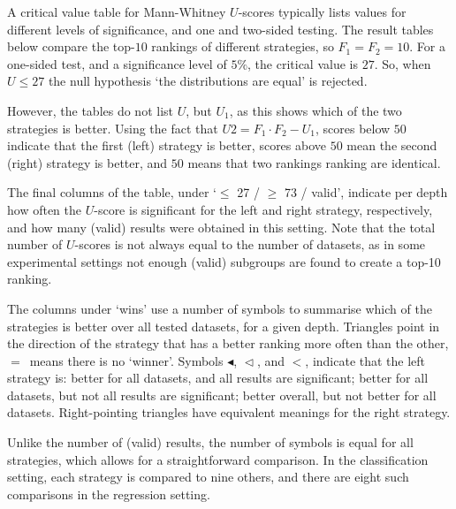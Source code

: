 \documentclass[smallextended]{svjour3}
\newcommand{\lmix}{$<$}                   %
\newcommand{\lall}{$\vartriangleleft$}    %
\newcommand{\lasi}{$\blacktriangleleft$}  %
\newcommand{\draw}{$=$}                   %
\begin{document}
A critical value table for Mann-Whitney $U$-scores typically lists values for different levels of significance, and one and two-sided testing.
The result tables below compare the top-$10$ rankings of different strategies, so $F_1 = F_2 = 10$.
For a one-sided test, and a significance level of $5\%$, the critical value is $27$.
So, when $U \leq 27$ the null hypothesis `the distributions are equal' is rejected.

However, the tables do not list $U$, but $U_1$, as this shows which of the two strategies is better.
Using the fact that $U2 = F_1 \cdot F_2 - U_1$, scores below $50$ indicate that the first (left) strategy is better, scores above $50$ mean the second (right) strategy is better, and $50$ means that two rankings ranking are identical.

The final columns of the table, under `$\leq$ 27 / $\geq$ 73 / valid', indicate per depth how often the $U$-score is significant for the left and right strategy, respectively, and how many (valid) results were obtained in this setting.
Note that the total number of $U$-scores is not always equal to the number of datasets, as in some experimental settings not enough (valid) subgroups are found to create a top-10 ranking.

The columns under `wins' use a number of symbols to summarise which of the strategies is better over all tested datasets, for a given depth.
Triangles point in the direction of the strategy that has a better ranking more often than the other, \draw\ means there is no `winner'.
Symbols \lasi, \lall, and \lmix, indicate that the left strategy is: better for all datasets, and all results are significant; better for all datasets, but not all results are significant; better overall, but not better for all datasets.
Right-pointing triangles have equivalent meanings for the right strategy.

Unlike the number of (valid) results, the number of symbols is equal for all strategies, which allows for a straightforward comparison.
In the classification setting, each strategy is compared to nine others, and there are eight such comparisons in the regression setting.
\end{document}
